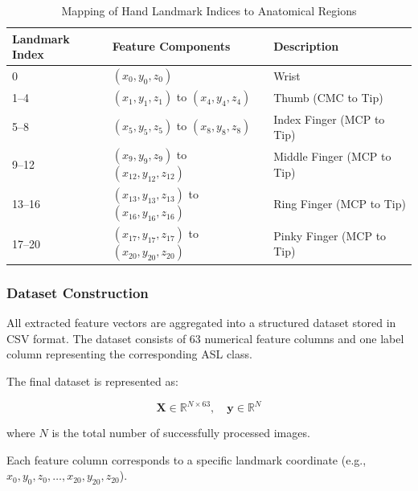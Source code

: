 \begin{table}[htbp]
\centering
\caption{Mapping of Hand Landmark Indices to Anatomical Regions}
\label{tab:landmarks}
\renewcommand{\arraystretch}{1.25}

\begin{tabularx}{\linewidth}{C{3cm} C{4cm} L{6cm}}
\hline
\textbf{Landmark Index} & \textbf{Feature Components} & \textbf{Description} \\
\hline

0 & $(x_0,y_0,z_0)$ & Wrist \\

1--4 & $(x_1,y_1,z_1)$ to $(x_4,y_4,z_4)$ & Thumb (CMC to Tip) \\

5--8 & $(x_5,y_5,z_5)$ to $(x_8,y_8,z_8)$ & Index Finger (MCP to Tip) \\

9--12 & $(x_9,y_9,z_9)$ to $(x_{12},y_{12},z_{12})$ & Middle Finger (MCP to Tip) \\

13--16 & $(x_{13},y_{13},z_{13})$ to $(x_{16},y_{16},z_{16})$ & Ring Finger (MCP to Tip) \\

17--20 & $(x_{17},y_{17},z_{17})$ to $(x_{20},y_{20},z_{20})$ & Pinky Finger (MCP to Tip) \\

\hline
\end{tabularx}
\end{table}

\subsubsection{Dataset Construction}

All extracted feature vectors are aggregated into a structured dataset stored in CSV format. The dataset consists of 63 numerical feature columns and one label column representing the corresponding ASL class.

The final dataset is represented as:

\[
\mathbf{X} \in \mathbb{R}^{N \times 63}, \quad \mathbf{y} \in \mathbb{R}^{N}
\]

where $N$ is the total number of successfully processed images.

Each feature column corresponds to a specific landmark coordinate (e.g., $x_0, y_0, z_0, \dots, x_{20}, y_{20}, z_{20}$).

